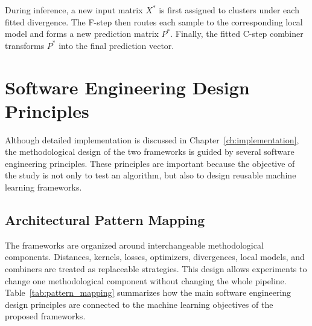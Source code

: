 \hs During inference, a new input matrix $X^*$ is first assigned to clusters under each fitted divergence. The F-step then routes each sample to the corresponding local model and forms a new prediction matrix $P^*$. Finally, the fitted C-step combiner transforms $P^*$ into the final prediction vector.


\section{Software Engineering Design Principles}
\label{sec:software_engineering_design}

\hs Although detailed implementation is discussed in Chapter~\ref{ch:implementation}, the methodological design of the two frameworks is guided by several software engineering principles. These principles are important because the objective of the study is not only to test an algorithm, but also to design reusable machine learning frameworks.

\subsection{Architectural Pattern Mapping}

\hs The frameworks are organized around interchangeable methodological components. Distances, kernels, losses, optimizers, divergences, local models, and combiners are treated as replaceable strategies. This design allows experiments to change one methodological component without changing the whole pipeline. Table~\ref{tab:pattern_mapping} summarizes how the main software engineering design principles are connected to the machine learning objectives of the proposed frameworks.

